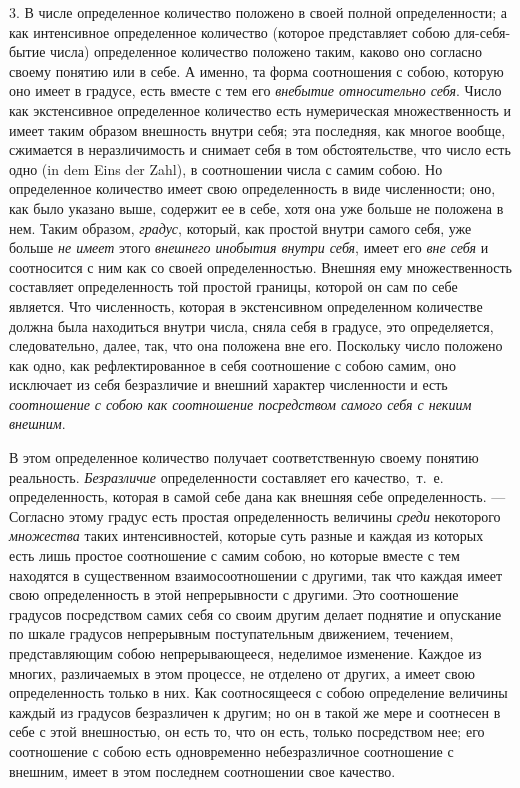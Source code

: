 {3. В числе определенное количество положено в своей полной определенности; а
как интенсивное определенное количество (которое представляет собою
для-себя-бытие числа) определенное количество положено таким, каково оно
согласно своему понятию или в себе. А именно, та форма соотношения с собою,
которую оно имеет в градусе, есть вместе с тем его
{\em внебытие относительно себя}. Число как
экстенсивное определенное количество есть нумерическая множественность и
имеет таким образом внешность внутри себя; эта последняя, как многое
вообще, сжимается в неразличимость и снимает себя в том обстоятельстве, что
число есть одно (in dem Eins der Zahl), в соотношении числа с самим собою.
Но определенное количество имеет свою определенность в виде численности;
оно, как было указано выше, содержит ее в себе, хотя она уже больше не
положена в нем. Таким образом, {\em градус}, который,
как простой внутри самого себя, уже больше {\em не
имеет} этого {\em внешнего инобытия внутри себя}, имеет
его {\em вне себя} и соотносится с ним как со своей
определенностью. Внешняя ему множественность составляет определенность той
простой границы, которой он сам по себе является. Что численность, которая
в экстенсивном определенном количестве должна была находиться внутри числа,
сняла себя в градусе, это определяется, следовательно, далее, так, что она
положена вне его. Поскольку число положено как одно, как рефлектированное в
себя соотношение с собою самим, оно исключает из себя безразличие и внешний
характер численности и есть {\em соотношение с собою
как соотношение посредством самого себя с некиим внешним}.

В этом определенное количество получает соответственную своему понятию
реальность. {\em Безразличие} определенности составляет
его качество,~т.~е. определенность, которая в самой себе дана как внешняя
себе определенность. — Согласно этому градус есть простая определенность
величины {\em среди} некоторого
{\em множества} таких интенсивностей, которые суть
разные и каждая из которых есть лишь простое соотношение с самим собою, но
которые вместе с тем находятся в существенном взаимосоотношении с другими,
так что каждая имеет свою определенность в этой непрерывности с другими.
Это соотношение градусов посредством самих себя со своим другим делает
поднятие и опускание по шкале градусов непрерывным поступательным
движением, течением, представляющим собою непрерывающееся, неделимое
изменение. Каждое из многих, различаемых в этом процессе, не отделено от
других, а имеет свою определенность только в них. Как соотносящееся с собою
определение величины каждый из градусов безразличен к другим; но он в такой
же мере и соотнесен в себе с этой внешностью, он есть то, что он есть,
только посредством нее; его соотношение с собою есть одновременно
небезразличное соотношение с внешним, имеет в этом последнем соотношении
свое качество.

}
